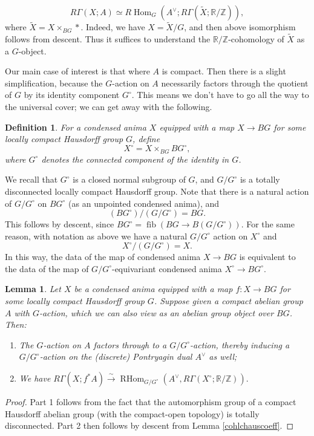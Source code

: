 \documentclass[12pt]{article}
\newtheorem{lemma}[theorem]{Lemma}
\newtheorem{definition}[theorem]{Definition}
\theoremstyle{definition}
\newcommand{\on}{\operatorname}
\newcommand{\mbb}{\mathbb}
\begin{document}
$$R\Gamma(X;A) \simeq R\on{Hom}_G(A^\vee; R\Gamma(\widetilde{X};\mbb{R}/\mbb{Z})),$$
where $\widetilde{X}=X\times_{BG}\ast$.  Indeed, we have $X=\widetilde{X}/G$, and then above isomorphism follows from descent. Thus it suffices to understand the $\mbb{R}/\mbb{Z}$-cohomology of $\widetilde{X}$ as a $G$-object.

Our main case of interest is that where $A$ is compact.  Then there is a slight simplification, because the $G$-action on $A$ necessarily factors through the quotient of $G$ by its identity component $G^\circ$.  This means we don't have to go all the way to the universal cover; we can get away with the following.

\begin{definition}\label{weirdunivcov}
For a condensed anima $X$ equipped with a map $X\to BG$ for some locally compact Hausdorff group $G$, define
$$X^\circ = X\times_{BG}BG^\circ,$$
where $G^\circ$ denotes the connected component of the identity in $G$.
\end{definition}

We recall that $G^\circ$ is a closed normal subgroup of $G$, and $G/G^\circ$ is a totally disconnected locally compact Hausdorff group.  Note that there is a natural action of $G/G^\circ$ on $BG^\circ$ (as an unpointed condensed anima), and
$$(BG^\circ)/(G/G^\circ) = BG.$$
This follows by descent, since $BG^\circ = \on{fib}(BG\to B(G/G^\circ))$.  For the same reason, with notation as above we have a natural $G/G^\circ$ action on $X^\circ$ and
$$X^\circ/(G/G^\circ)=X.$$
In this way, the data of the map of condensed anima $X \to BG$ is equivalent to the data of the map of $G/G^\circ$-equivariant condensed anima $X^\circ \to BG^\circ$.

\begin{lemma}\label{cohchauscoeff}
Let $X$ be a condensed anima equipped with a map $f:X\to BG$ for some locally compact Hausdorff group $G$.  Suppose given a compact abelian group $A$ with $G$-action, which we can also view as an abelian group object over $BG$.  Then:
\begin{enumerate}
\item The $G$-action on $A$ factors through to a $G/G^\circ$-action, thereby inducing a $G/G^\circ$-action on the (discrete) Pontryagin dual $A^\vee$ as well;
\item We have $R\Gamma(X;f^\ast A) \overset{\sim}{\rightarrow} \on{RHom}_{G/G^\circ}(A^\vee,R\Gamma(X^\circ;\mbb{R}/\mbb{Z})).$
\end{enumerate}
\end{lemma}
\begin{proof}
Part 1 follows from the fact that the automorphism group of a compact Hausdorff abelian group (with the compact-open topology) is totally disconnected.  Part 2 then follows by descent from Lemma \ref{cohlchauscoeff}.
\end{proof}
\end{document}

